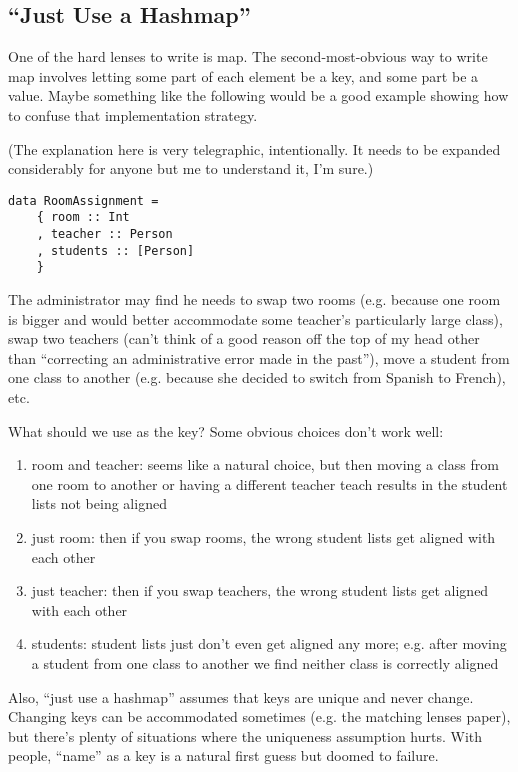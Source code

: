 \subsection{``Just Use a Hashmap''}
One of the hard lenses to write is map.
The second-most-obvious way to write map involves letting some part of each
element be a key, and some part be a value.
Maybe something like the following would be a good example showing how to
confuse that implementation strategy.

(The explanation here is very telegraphic, intentionally. It needs to be
expanded considerably for anyone but me to understand it, I'm sure.)

\begin{verbatim}
data RoomAssignment =
    { room :: Int
    , teacher :: Person
    , students :: [Person]
    }
\end{verbatim}

The administrator may find he needs to swap two rooms (e.g. because one room
is bigger and would better accommodate some teacher's particularly large
class), swap two teachers (can't think of a good reason off the top of my
head other than ``correcting an administrative error made in the past''),
move a student from one class to another (e.g. because she decided to switch
from Spanish to French), etc.

What should we use as the key? Some obvious choices don't work well:
\begin{enumerate}
    \item room and teacher: seems like a natural choice, but then moving a
        class from one room to another or having a different teacher teach
        results in the student lists not being aligned
    \item just room: then if you swap rooms, the wrong student lists get aligned
        with each other
    \item just teacher: then if you swap teachers, the wrong student lists get
        aligned with each other
    \item students: student lists just don't even get aligned any more; e.g.
        after moving a student from one class to another we find neither
        class is correctly aligned
\end{enumerate}

Also, ``just use a hashmap'' assumes that keys are unique and never change.
Changing keys can be accommodated sometimes (e.g. the matching lenses
paper), but there's plenty of situations where the uniqueness assumption
hurts. With people, ``name'' as a key is a natural first guess but doomed to
failure.

